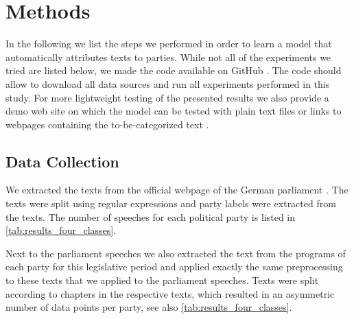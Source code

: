\documentclass{article} %
\begin{document}
\section{Methods}

In the following we list the steps we performed in order to learn a model that automatically attributes texts to parties. While not all of the experiments we tried are listed below, we made the code available on GitHub \cite{linksrechts_code}. The code should allow to download all data sources and run all experiments performed in this study. For more lightweight testing of the presented results we also provide a demo web site on which the model can be tested with plain text files or links to webpages containing the to-be-categorized text \cite{linksrechts}. 

\subsection{Data Collection}\label{sec:collection}
We extracted the texts from the official webpage of the German parliament \cite{plenarprotokolle}. The texts were split using regular expressions and party labels were extracted from the texts. The number of speeches for each political party is listed in \autoref{tab:results_four_classes}. 

Next to the parliament speeches we also extracted the text from the programs of each party for this legislative period \cite{linke_parteiprogramm, gruene_parteiprogramm,spd_parteiprogramm, cdu_parteiprogramm} and applied exactly the same preprocessing to these texts that we applied to the parliament speeches. Texts were split according to chapters in the respective texts, which resulted in an asymmetric number of data points per party, see also \autoref{tab:results_four_classes}.
\end{document}
